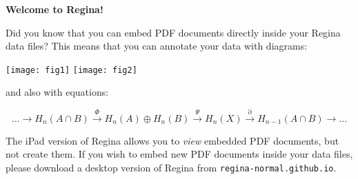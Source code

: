 \documentclass[a4paper,10pt]{article}
\begin{document}
\thispagestyle{empty}
\centerline{\large \bf{Welcome to Regina!}}

\bigskip

Did you know that you can embed PDF documents directly inside your
Regina data files?
This means that you can annotate your data with diagrams:

\bigskip

\centerline{
    \texttt{[image: fig1]}\qquad\qquad
    \texttt{[image: fig2]}}

\medskip

\noindent
and also with equations:

\[ \ldots
    \longrightarrow H_n(A \cap B)
    \stackrel{\Phi}{\longrightarrow} H_n(A) \oplus H_n(B)
    \stackrel{\Psi}{\longrightarrow} H_n(X)
    \stackrel{\partial}{\longrightarrow} H_{n-1}(A \cap B)
    \longrightarrow \ldots
\]

The iPad version of Regina allows you to \emph{view} embedded PDF documents,
but not create them.
If you wish to embed new PDF documents inside your data files,
please download a desktop version of Regina from
\texttt{regina-normal.github.io}.
\end{document}
